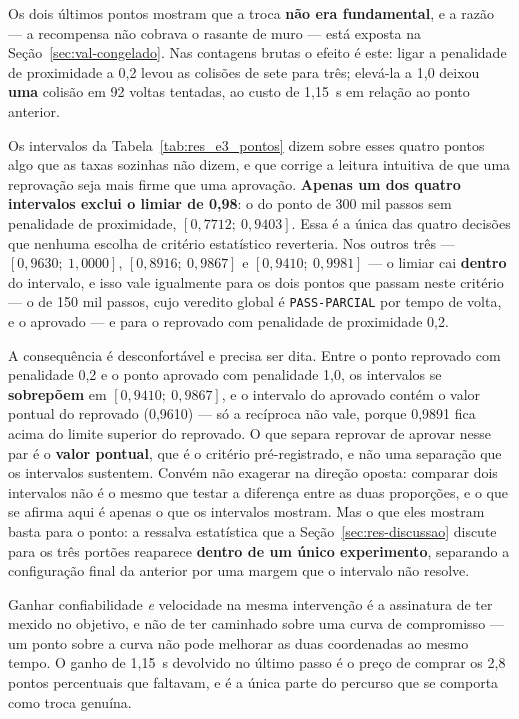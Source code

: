 Os dois últimos pontos mostram que a troca \textbf{não era fundamental}, e a
razão --- a recompensa não cobrava o rasante de muro --- está exposta na
Seção~\ref{sec:val-congelado}. Nas contagens brutas o efeito é este: ligar a
penalidade de proximidade a 0,2 levou as colisões de sete para três; elevá-la a
1,0 deixou \textbf{uma} colisão em 92 voltas tentadas, ao custo de 1,15~s em
relação ao ponto anterior.

Os intervalos da Tabela~\ref{tab:res_e3_pontos} dizem sobre esses quatro pontos
algo que as taxas sozinhas não dizem, e que corrige a leitura intuitiva de que
uma reprovação seja mais firme que uma aprovação. \textbf{Apenas um dos quatro
intervalos exclui o limiar de 0,98}: o do ponto de 300 mil passos sem penalidade
de proximidade, $[0{,}7712;\ 0{,}9403]$. Essa é a única das quatro decisões que
nenhuma escolha de critério estatístico reverteria. Nos outros três
--- $[0{,}9630;\ 1{,}0000]$, $[0{,}8916;\ 0{,}9867]$ e
$[0{,}9410;\ 0{,}9981]$ --- o limiar cai \textbf{dentro} do intervalo, e isso
vale igualmente para os dois pontos que passam neste critério --- o de 150 mil
passos, cujo veredito global é \texttt{PASS-PARCIAL} por tempo de volta, e o
aprovado --- e para o reprovado com penalidade de proximidade 0,2.

A consequência é desconfortável e precisa ser dita. Entre o ponto reprovado com
penalidade 0,2 e o ponto aprovado com penalidade 1,0, os intervalos se
\textbf{sobrepõem} em $[0{,}9410;\ 0{,}9867]$, e o intervalo do aprovado contém
o valor pontual do reprovado (0,9610) --- só a recíproca não vale, porque 0,9891
fica acima do limite superior do reprovado. O que separa reprovar de aprovar
nesse par é o \textbf{valor pontual}, que é o critério pré-registrado, e não uma
separação que os intervalos sustentem. Convém não exagerar na direção oposta:
comparar dois intervalos não é o mesmo que testar a diferença entre as duas
proporções, e o que se afirma aqui é apenas o que os intervalos mostram. Mas o
que eles mostram basta para o ponto: a ressalva estatística que a
Seção~\ref{sec:res-discussao} discute para os três portões reaparece
\textbf{dentro de um único experimento}, separando a configuração final da
anterior por uma margem que o intervalo não resolve.

Ganhar confiabilidade \textit{e} velocidade na mesma intervenção é a assinatura
de ter mexido no objetivo, e não de ter caminhado sobre uma curva de compromisso
--- um ponto sobre a curva não pode melhorar as duas coordenadas ao mesmo tempo.
O ganho de 1,15~s devolvido no último passo é o preço de comprar os 2,8 pontos
percentuais que faltavam, e é a única parte do percurso que se comporta como
troca genuína.


